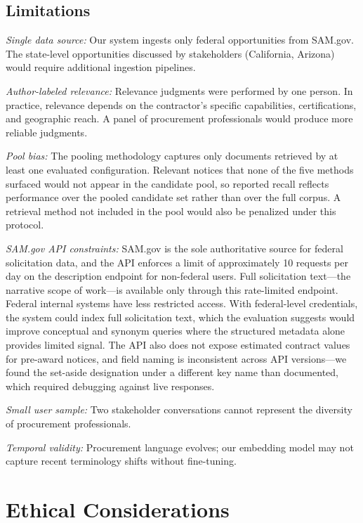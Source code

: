 \documentclass[10pt,twocolumn]{article}
\begin{document}
\subsection{Limitations}

\textit{Single data source:} Our system ingests only federal opportunities from SAM.gov. The state-level opportunities discussed by stakeholders (California, Arizona) would require additional ingestion pipelines.

\textit{Author-labeled relevance:} Relevance judgments were performed by one person. In practice, relevance depends on the contractor's specific capabilities, certifications, and geographic reach. A panel of procurement professionals would produce more reliable judgments.

\textit{Pool bias:} The pooling methodology captures only documents retrieved by at least one evaluated configuration. Relevant notices that none of the five methods surfaced would not appear in the candidate pool, so reported recall reflects performance over the pooled candidate set rather than over the full corpus. A retrieval method not included in the pool would also be penalized under this protocol.

\textit{SAM.gov API constraints:} SAM.gov is the sole authoritative source for federal solicitation data, and the API enforces a limit of approximately 10 requests per day on the description endpoint for non-federal users. Full solicitation text---the narrative scope of work---is available only through this rate-limited endpoint. Federal internal systems have less restricted access. With federal-level credentials, the system could index full solicitation text, which the evaluation suggests would improve conceptual and synonym queries where the structured metadata alone provides limited signal. The API also does not expose estimated contract values for pre-award notices, and field naming is inconsistent across API versions---we found the set-aside designation under a different key name than documented, which required debugging against live responses.

\textit{Small user sample:} Two stakeholder conversations cannot represent the diversity of procurement professionals.

\textit{Temporal validity:} Procurement language evolves; our embedding model may not capture recent terminology shifts without fine-tuning.

\section{Ethical Considerations}
\end{document}
